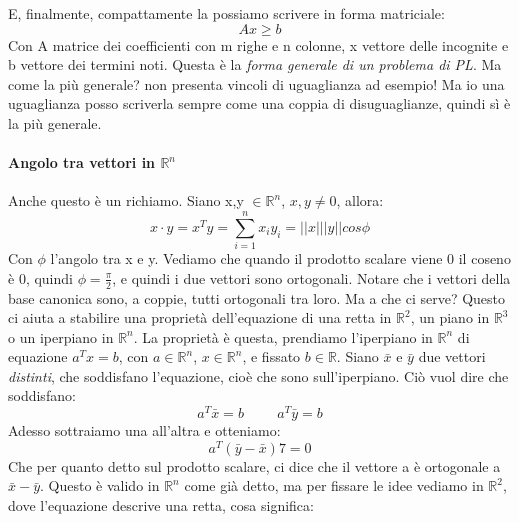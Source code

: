 E, finalmente, compattamente la possiamo scrivere in forma matriciale:
\begin{equation*}
    Ax \geq b    
\end{equation*}
Con A matrice dei coefficienti con m righe e n colonne, x vettore delle incognite e b vettore dei termini noti.
Questa è la \textit{forma generale di un problema di PL}. Ma come la più generale? non presenta vincoli di uguaglianza ad esempio! Ma io una uguaglianza posso scriverla sempre come una coppia di disuguaglianze, quindi sì è la più generale.



\paragraph{Angolo tra vettori in $\mathbb{R}^n$} Anche questo è un richiamo. Siano x,y $\in \mathbb{R}^n$, $x,y \neq 0$, allora:
\begin{equation*}
    x \cdot y = x^{T}y = \sum_{i=1}^n x_iy_i = ||x|||y||cos\phi
\end{equation*}
Con $\phi$ l'angolo tra x e y. Vediamo che quando il prodotto scalare viene 0 il coseno è 0, quindi $\phi = \frac{\pi}{2}$, e quindi i due vettori sono ortogonali. Notare che i vettori della base canonica sono, a coppie, tutti ortogonali tra loro. Ma a che ci serve? Questo ci aiuta a stabilire una proprietà dell'equazione di una retta in $\mathbb{R}^2$, un piano in $\mathbb{R}^3$ o un iperpiano in $\mathbb{R}^n$. La proprietà è questa, prendiamo l'iperpiano in $\mathbb{R}^n$ di equazione $a^{T}x = b$, con $a \in \mathbb{R}^n$, $x \in \mathbb{R}^n$, e fissato $b \in \mathbb{R}$. Siano $\bar{x}$ e $\bar{y}$ due vettori \textit{distinti}, che soddisfano l'equazione, cioè che sono sull'iperpiano. Ciò vuol dire che soddisfano:
\begin{equation*}
    a^{T}\bar{x} = b \hspace{1cm} a^{T}\bar{y} = b
\end{equation*}
Adesso sottraiamo una all'altra e otteniamo:
\begin{equation*}
    a^{T}(\bar{y}-\bar{x})7 = 0
\end{equation*}
Che per quanto detto sul prodotto scalare, ci dice che il vettore a è ortogonale a $\bar{x}-\bar{y}$. Questo è valido in $\mathbb{R}^n$ come già detto, ma per fissare le idee vediamo in $\mathbb{R}^2$, dove l'equazione descrive una retta, cosa significa:
